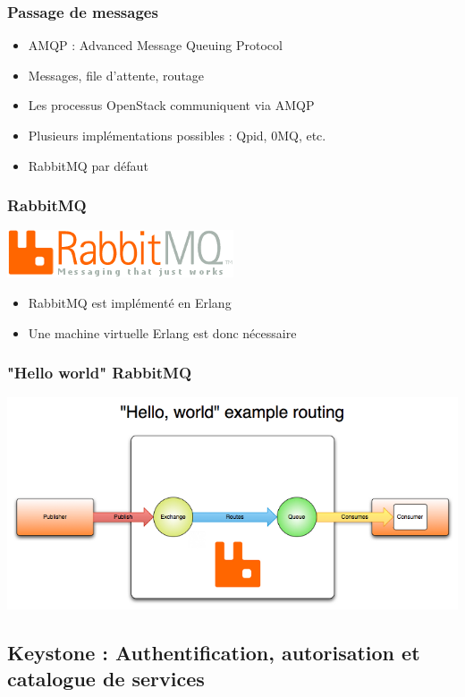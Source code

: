   \begin{frame}
    \frametitle{Passage de messages}
    \begin{itemize}
      \item AMQP : Advanced Message Queuing Protocol
      \item Messages, file d'attente, routage
      \item Les processus OpenStack communiquent via AMQP
      \item Plusieurs implémentations possibles : Qpid, 0MQ, etc.
      \item RabbitMQ par défaut
    \end{itemize}
  \end{frame}

  \begin{frame}
  \frametitle{RabbitMQ}
    \begin{center}
      \includegraphics{images/rabbitmq-logo.png}
    \end{center}
    \begin{itemize}
      \item RabbitMQ est implémenté en Erlang
      \item Une machine virtuelle Erlang est donc nécessaire
    \end{itemize}
  \end{frame}

  \begin{frame}
    \frametitle{"Hello world" RabbitMQ}
    \includegraphics[width=\textwidth]{images/rabbitmq-schema.png}
  \end{frame}

  \subsection[Keystone]{Keystone : Authentification, autorisation et catalogue de services}

